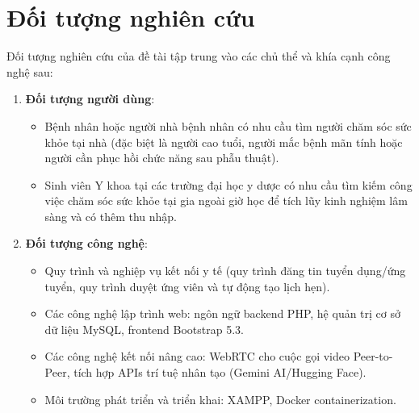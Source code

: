 \documentclass[13pt,a4paper]{extreport}
\begin{document}
\section{Đối tượng nghiên cứu}
Đối tượng nghiên cứu của đề tài tập trung vào các chủ thể và khía cạnh công nghệ sau:
\begin{enumerate}
    \item \textbf{Đối tượng người dùng}:
    \begin{itemize}
        \item Bệnh nhân hoặc người nhà bệnh nhân có nhu cầu tìm người chăm sóc sức khỏe tại nhà (đặc biệt là người cao tuổi, người mắc bệnh mãn tính hoặc người cần phục hồi chức năng sau phẫu thuật).
        \item Sinh viên Y khoa tại các trường đại học y dược có nhu cầu tìm kiếm công việc chăm sóc sức khỏe tại gia ngoài giờ học để tích lũy kinh nghiệm lâm sàng và có thêm thu nhập.
    \end{itemize}
    \item \textbf{Đối tượng công nghệ}:
    \begin{itemize}
        \item Quy trình và nghiệp vụ kết nối y tế (quy trình đăng tin tuyển dụng/ứng tuyển, quy trình duyệt ứng viên và tự động tạo lịch hẹn).
        \item Các công nghệ lập trình web: ngôn ngữ backend PHP, hệ quản trị cơ sở dữ liệu MySQL, frontend Bootstrap 5.3.
        \item Các công nghệ kết nối nâng cao: WebRTC cho cuộc gọi video Peer-to-Peer, tích hợp APIs trí tuệ nhân tạo (Gemini AI/Hugging Face).
        \item Môi trường phát triển và triển khai: XAMPP, Docker containerization.
    \end{itemize}
\end{enumerate}
\end{document}
